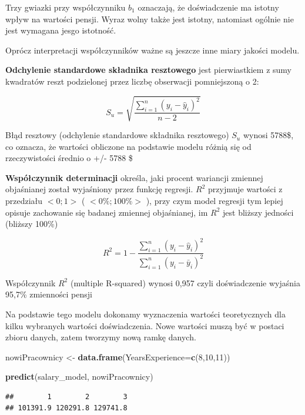 \documentclass[
]{book}
\newenvironment{Shaded}{\begin{snugshade}}{\end{snugshade}}
\newcommand{\DataTypeTok}[1]{\textcolor[rgb]{0.13,0.29,0.53}{#1}}
\newcommand{\DecValTok}[1]{\textcolor[rgb]{0.00,0.00,0.81}{#1}}
\newcommand{\KeywordTok}[1]{\textcolor[rgb]{0.13,0.29,0.53}{\textbf{#1}}}
\newcommand{\NormalTok}[1]{#1}
\newcommand{\StringTok}[1]{\textcolor[rgb]{0.31,0.60,0.02}{#1}}
\begin{document}
Trzy gwiazki przy współczynniku \(b_1\) oznaczają, że doświadczenie ma istotny wpływ na wartości pensji. Wyraz wolny także jest istotny, natomiast ogólnie nie jest wymagana jesgo istotność.

Oprócz interpretacji współczynników ważne są jeszcze inne miary jakości modelu.

\textbf{Odchylenie standardowe składnika resztowego} jest pierwiastkiem z sumy kwadratów reszt podzielonej przez liczbę obserwacji pomniejszoną o 2:

\[S_{u}=\sqrt{\frac{\sum\limits_{i=1}^{n}{(y_{i}-\hat{y}_{i})^2}}{n-2}}\]

Błąd resztowy (odchylenie standardowe składnika resztowego) \(S_u\) wynosi 5788\$, co oznacza, że wartości obliczone na podstawie modelu różnią się od rzeczywistości średnio o +/- 5788
\$

\textbf{Współczynnik determinacji} określa, jaki procent wariancji zmiennej objaśnianej został wyjaśniony przez funkcję regresji. \(R^2\) przyjmuje wartości z przedziału \(<0;1>\) ( \(<0\%;100\%>\) ), przy czym model regresji tym lepiej opisuje zachowanie się badanej zmiennej objaśnianej, im \(R^2\) jest bliższy jedności (bliższy 100\%)

\[R^2=1-\frac{\sum\limits_{i=1}^{n}{(y_{i}-\hat{y}_{i})^2}}{\sum\limits_{i=1}^{n}{(y_{i}-\bar{y}_{i})^2}}\]

Współczynnik \(R^2\) (multiple R-squared) wynosi 0,957 czyli doświadczenie wyjaśnia 95,7\% zmienności pensji

Na podstawie tego modelu dokonamy wyznaczenia wartości teoretycznych dla kilku wybranych wartości doświadczenia. Nowe wartości muszą być w postaci zbioru danych, zatem tworzymy nową ramkę danych.

\begin{Shaded}
\begin{Highlighting}[]
\NormalTok{nowiPracownicy <-}\StringTok{ }\KeywordTok{data.frame}\NormalTok{(}\DataTypeTok{YearsExperience=}\KeywordTok{c}\NormalTok{(}\DecValTok{8}\NormalTok{,}\DecValTok{10}\NormalTok{,}\DecValTok{11}\NormalTok{))}

\KeywordTok{predict}\NormalTok{(salary_model, nowiPracownicy)}
\end{Highlighting}
\end{Shaded}

\begin{verbatim}
##        1        2        3 
## 101391.9 120291.8 129741.8
\end{verbatim}
\end{document}
